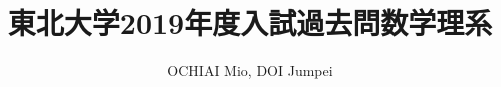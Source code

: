 \documentclass[a4,12pt]{jsarticle}
\theoremstyle{definition}
\numberwithin{equation}{section}
\begin{document}
\title{東北大学2019年度入試過去問数学理系}
\author{OCHIAI Mio, DOI Jumpei}
\date{}
\maketitle
\newpage



\end{document}
